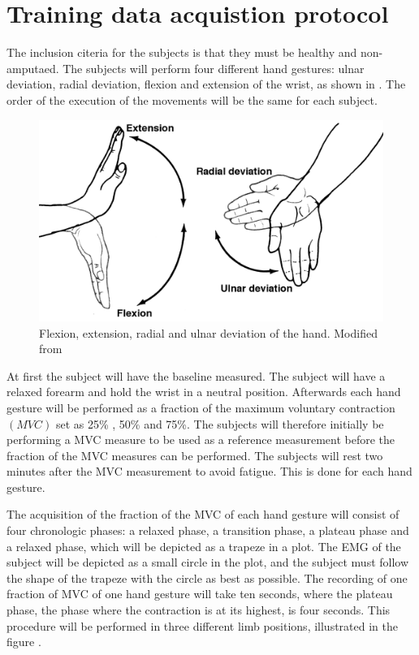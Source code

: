 \section{Training data acquistion protocol}

The inclusion citeria for the subjects is that they must be healthy and non-amputaed. The subjects will perform four different hand gestures: ulnar deviation, radial deviation, flexion and extension of the wrist, as shown in . The order of the execution of the movements will be the same for each subject.

\begin{figure}[H]                    
	\includegraphics[width=.5\textwidth]{figures/Anatomy/wrist_move}  %
	\caption{Flexion, extension, radial and ulnar deviation of the hand. Modified from  \cite{hamilton2008}}
	\label{fig:handgest}  %
\end{figure}

At first the subject will have the baseline measured. The subject will have a relaxed forearm and hold the wrist in a neutral position. Afterwards each hand gesture will be performed as a fraction of the maximum voluntary contraction $\left( MVC\right)$ set as 25\% , 50\% and 75\%. The subjects will therefore initially be performing a MVC measure to be used as a reference measurement before the fraction of the MVC measures can be performed. The subjects will rest two minutes after the MVC measurement to avoid fatigue. This is done for each hand gesture. 

The acquisition of the fraction of the MVC of each hand gesture will consist of four chronologic phases: a relaxed phase, a transition phase, a plateau phase and a relaxed phase, which will be depicted as a trapeze in a plot. The EMG of the subject will be depicted as a small circle in the plot, and the subject must follow the shape of the trapeze with the circle as best as possible. The recording of one fraction of MVC of one hand gesture will take ten seconds, where the plateau phase, the phase where the contraction is at its highest, is four seconds. 
This procedure will be performed in three different limb positions, illustrated in the figure .

